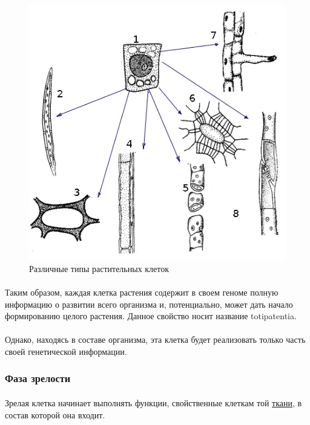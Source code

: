 \begin{figure}[h!]
  \centering
       \includegraphics[width=0.5\linewidth]{pictures/plants_cells}
\caption{Различные типы растительных клеток}
\label{plants_cells}
\end{figure}

\paragraph*{}

\paragraph*{}Таким образом, каждая клетка растения содержит в своем геноме полную информацию о развитии всего организма и, потенциально, может дать начало формированию целого растения. Данное свойство носит название \gls{totipatentia}. 

\paragraph*{}Однако, находясь в составе организма, эта клетка будет реализовать только часть своей генетической информации. 

\subsubsection*{Фаза зрелости} 

\paragraph*{}Зрелая клетка начинает выполнять функции, свойственные клеткам той \hyperlink{plants_tisues}{ткани}, в состав которой она входит.

